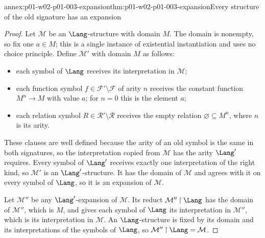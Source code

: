 \begin{annexitem}{annex:p01-w02-p01-003-expansion}{thm:p01-w02-p01-003-expansion}{Every structure of the old signature has an expansion}
\begin{proof}
Let \(\mathcal M\) be an \(\Lang\)-structure with domain \(M\). The domain
is nonempty, so fix one \(a\in M\); this is a single instance of
existential instantiation and uses no choice principle. Define
\(\mathcal M'\) with domain \(M\) as follows:
\begin{itemize}
  \item each symbol of \(\Lang\) receives its interpretation in
        \(\mathcal M\);
  \item each function symbol \(f\in\mathcal F'\setminus\mathcal F\) of
        arity \(n\) receives the constant function
        \(M^{n}\to M\) with value \(a\); for \(n=0\) this is the element
        \(a\);
  \item each relation symbol \(R\in\mathcal R'\setminus\mathcal R\)
        receives the empty relation \(\varnothing\subseteq M^{n}\), where
        \(n\) is its arity.
\end{itemize}
These clauses are well defined because the arity of an old symbol is the
same in both signatures, so the interpretation copied from \(\mathcal M\)
has the arity \(\Lang'\) requires. Every symbol of \(\Lang'\) receives
exactly one interpretation of the right kind, so \(\mathcal M'\) is an
\(\Lang'\)-structure. It has the domain of \(\mathcal M\) and agrees with it
on every symbol of \(\Lang\), so it is an expansion of \(\mathcal M\).

Let \(\mathcal M''\) be any \(\Lang'\)-expansion of \(\mathcal M\). Its
reduct \(\mathcal M''\mathbin{\upharpoonright}\Lang\) has the domain of
\(\mathcal M''\), which is \(M\), and gives each symbol of \(\Lang\) its
interpretation in \(\mathcal M''\), which is its interpretation in
\(\mathcal M\). An \(\Lang\)-structure is fixed by its domain and its
interpretations of the symbols of \(\Lang\), so
\(\mathcal M''\mathbin{\upharpoonright}\Lang=\mathcal M\).
\end{proof}
\end{annexitem}

